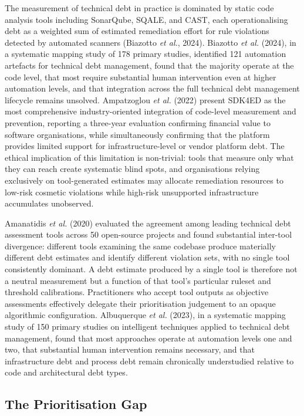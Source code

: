 \documentclass[
  british,
  12pt,
  a4paper,
]{report}
\begin{document}
The measurement of technical debt in practice is dominated by static
code analysis tools including SonarQube, SQALE, and CAST, each
operationalising debt as a weighted sum of estimated remediation effort
for rule violations detected by automated scanners (Biazotto \emph{et
al.}, 2024). Biazotto \emph{et al.} (2024), in a systematic mapping
study of 178 primary studies, identified 121 automation artefacts for
technical debt management, found that the majority operate at the code
level, that most require substantial human intervention even at higher
automation levels, and that integration across the full technical debt
management lifecycle remains unsolved. Ampatzoglou \emph{et al.} (2022)
present SDK4ED as the most comprehensive industry-oriented integration
of code-level measurement and prevention, reporting a three-year
evaluation confirming financial value to software organisations, while
simultaneously confirming that the platform provides limited support for
infrastructure-level or vendor platform debt. The ethical implication of
this limitation is non-trivial: tools that measure only what they can
reach create systematic blind spots, and organisations relying
exclusively on tool-generated estimates may allocate remediation
resources to low-risk cosmetic violations while high-risk unsupported
infrastructure accumulates unobserved.

Amanatidis \emph{et al.} (2020) evaluated the agreement among leading
technical debt assessment tools across 50 open-source projects and found
substantial inter-tool divergence: different tools examining the same
codebase produce materially different debt estimates and identify
different violation sets, with no single tool consistently dominant. A
debt estimate produced by a single tool is therefore not a neutral
measurement but a function of that tool's particular ruleset and
threshold calibrations. Practitioners who accept tool outputs as
objective assessments effectively delegate their prioritisation
judgement to an opaque algorithmic configuration. Albuquerque \emph{et
al.} (2023), in a systematic mapping study of 150 primary studies on
intelligent techniques applied to technical debt management, found that
most approaches operate at automation levels one and two, that
substantial human intervention remains necessary, and that
infrastructure debt and process debt remain chronically understudied
relative to code and architectural debt types.

\subsection{The Prioritisation Gap}\label{the-prioritisation-gap}
\end{document}
